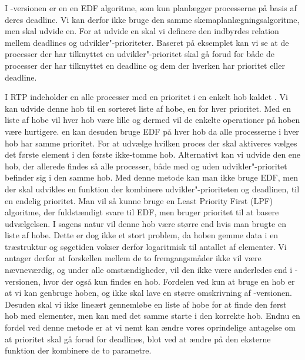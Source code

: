 I -versionen er \sched en en EDF algoritme, som kun planlægger processerne på basis af deres deadline. Vi kan derfor ikke bruge den samme skemaplanlægningsalgoritme, men skal udvide \sched en. For at udvide \sched en skal vi definere den indbyrdes relation mellem deadlines og udvikler"-prioriteter. Baseret på eksemplet kan vi se at de processer der har  tilknyttet en udvikler"-prioritet skal gå forud for både de processer der har tilknyttet en deadline og dem der hverken har prioritet eller deadline. 

I RTP  indeholder \sched en alle processer med en prioritet i en enkelt hob kaldet . Vi kan udvide denne hob til en sorteret liste af hobe, en for hver prioritet. Med en liste af hobe vil hver hob være lille og dermed vil de enkelte operationer på hoben være hurtigere. \Sched en kan desuden bruge EDF på hver hob da alle processerne i hver hob har samme prioritet. For at udvælge hvilken proces der skal aktiveres vælges det første element i den første ikke-tomme hob. 
Alternativt kan vi udvide den ene hob, der allerede findes så alle processer, både med og uden udvikler"-prioritet befinder sig i den samme hob. Med denne metode kan man ikke bruge EDF, men der skal udvikles en  funktion der kombinere  udvikler"-prioriteten og deadlinen, til en endelig prioritet. Man vil så kunne bruge en Least Priority First (LPF) algoritme, der fuldstændigt svare til EDF, men bruger prioritet til at basere udvælgelsen. I sagens natur vil denne hob  være større end hvis man brugte en liste af hobe. Dette er dog ikke et stort problem, da hoben gemme data i en træstruktur og  søgetiden vokser derfor logaritmisk til antallet af elementer. Vi antager derfor at forskellen mellem de to fremgangsmåder ikke vil være nævneværdig, og under alle omstændigheder, vil den ikke være anderledes end i -versionen, hvor der også kun findes en hob. Fordelen ved kun at bruge en hob er at vi kan genbruge  hoben, og  ikke skal lave en større omskrivning af -versionen. Desuden skal vi ikke lineært gennemløbe en liste af hobe for at finde den først hob med elementer, men kan med det samme starte i den korrekte hob. Endnu en fordel ved denne metode er at vi nemt kan  ændre vores oprindelige antagelse om at prioritet skal gå forud for deadlines, blot ved at ændre på den eksterne funktion der kombinere de to parametre.

